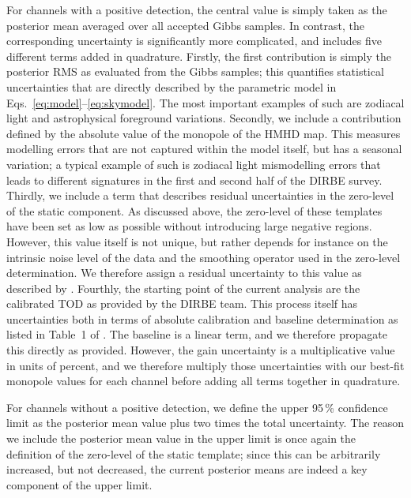\documentclass{aa}
\begin{document}
For channels with a positive detection, the central value is simply
taken as the posterior mean averaged over all accepted Gibbs
samples. In contrast, the corresponding uncertainty is significantly
more complicated, and includes five different terms added in
quadrature. Firstly, the first contribution is simply the posterior
RMS as evaluated from the Gibbs samples; this quantifies statistical
uncertainties that are directly described by the parametric model in
Eqs.~\eqref{eq:model}--\eqref{eq:skymodel}. The most important
examples of such are zodiacal light and astrophysical foreground
variations. Secondly, we include a contribution defined by the
absolute value of the monopole of the HMHD map. This measures
modelling errors that are not captured within the model itself, but
has a seasonal variation; a typical example of such is zodiacal light
mismodelling errors that leads to different signatures in the first
and second half of the DIRBE survey. Thirdly, we include a term that
describes residual uncertainties in the zero-level of the static
component. As discussed above, the zero-level of these templates have
been set as low as possible without introducing large negative
regions. However, this value itself is not unique, but rather depends
for instance on the intrinsic noise level of the data and the
smoothing operator used in the zero-level determination. We therefore
assign a residual uncertainty to this value as described by
\citet{CG02_01}. Fourthly, the starting point of the current analysis
are the calibrated TOD as provided by the DIRBE team. This process
itself has uncertainties both in terms of absolute calibration and
baseline determination as listed in Table~1 of \citet{hauser1998}. The
baseline is a linear term, and we therefore propagate this directly as
provided. However, the gain uncertainty is a multiplicative value in
units of percent, and we therefore multiply those uncertainties with
our best-fit monopole values for each channel before adding
all terms together in quadrature.


For channels without a positive detection, we define the upper 95\,\%
confidence limit as the posterior mean value plus two times the total
uncertainty. The reason we include the posterior mean value in the
upper limit is once again the definition of the zero-level of the
static template; since this can be arbitrarily increased, but not
decreased, the current posterior means are indeed a key component of
the upper limit.
\end{document}
